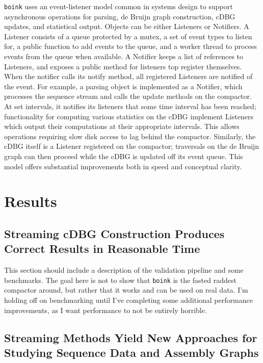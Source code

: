 \documentclass[preprint,number,12pt]{elsarticle}
\begin{document}

\texttt{boink} uses an event-listener model common in systems design to support asynchronous operations for parsing, de Bruijn graph construction, cDBG updates, and statistical output.
Objects can be either Listeners or Notifiers. A Listener consists of a queue protected by a mutex, a set of event types to listen for, a public function to add events to the queue, and a worker thread to process events from the queue when available. A Notifier keeps a list of references to Listeners, and exposes a public method for listeners top register themselves. When the notifier calls its notify method, all registered Listeners are notified of the event. For example, a parsing object is implemented as a Notifier, which processes the sequence stream and calls the update methods on the compactor. At set intervals, it notifies its listeners that some time interval has been reached; functionality for computing various statistics on the cDBG implement Listeners which output their computations at their appropriate intervals. This allows operations requiring slow disk access to lag behind the compactor. Similarly, the cDBG itself is a Listener registered on the compactor; traversals on the de Bruijn graph can then proceed while the cDBG is updated off its event queue. This model offers substantial improvements both in speed and conceptual clarity.

\section{Results}\label{sec:results}

\subsection{Streaming cDBG Construction Produces Correct Results in Reasonable Time}\label{sec:correctness}

This section should include a description of the validation pipeline and some benchmarks. The goal here is not to show that \texttt{boink} is the fasted raddest compactor around, but rather that it works and can be used on real data. I'm holding off on benchmarking until I've completing some additional performance improvements, as I want performance to not be entirely horrible.

\subsection{Streaming Methods Yield New Approaches for Studying Sequence Data and Assembly Graphs}\label{sec:approaches}
\end{document}
